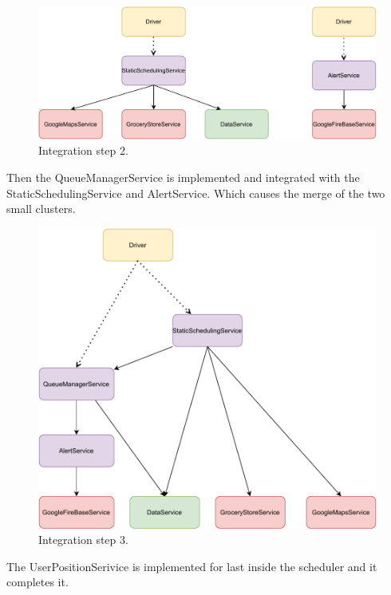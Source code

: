 \begin{figure}[H]
    \centering
    \includegraphics[width=1.0\textwidth]{images/component2.pdf}
    \caption{Integration step 2.}
\end{figure}

Then the QueueManagerService is implemented and integrated with the StaticSchedulingService and AlertService. Which causes the merge of the two small clusters.

\begin{figure}[H]
    \centering
    \includegraphics[width=1.0\textwidth]{images/component3.pdf}
    \caption{Integration step 3.}
\end{figure}

The UserPositionSerivice is implemented for last inside the scheduler and it completes it.

